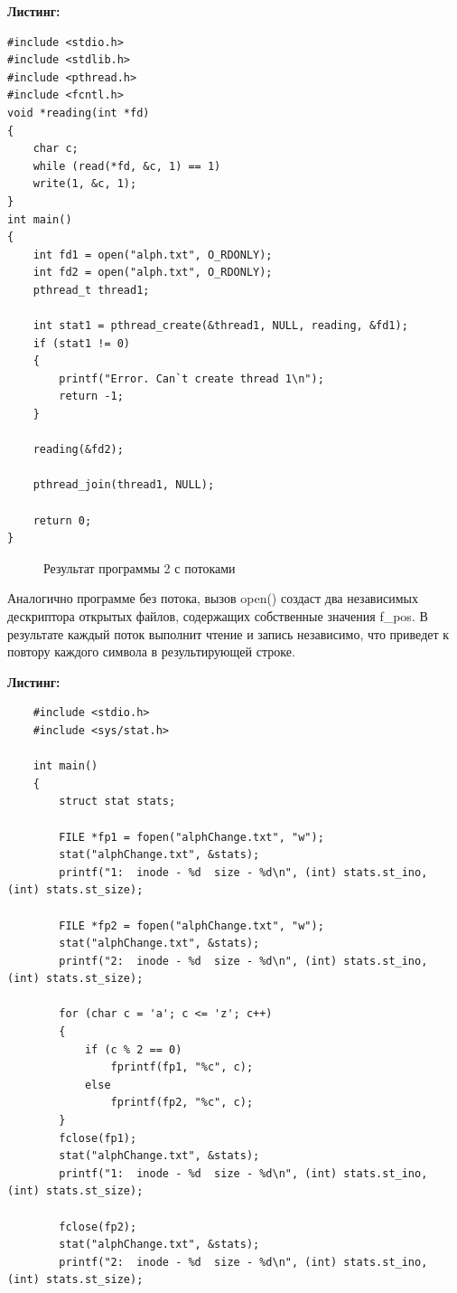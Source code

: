 \documentclass[14pt, a4paper]{extarticle}
\begin{document}
\clearpage
\textbf{Листинг:}
\begin{lstlisting}
#include <stdio.h>
#include <stdlib.h>
#include <pthread.h>
#include <fcntl.h>
void *reading(int *fd)
{
	char c;
	while (read(*fd, &c, 1) == 1)
	write(1, &c, 1);
}
int main()
{
	int fd1 = open("alph.txt", O_RDONLY);
	int fd2 = open("alph.txt", O_RDONLY);
	pthread_t thread1;
	
	int stat1 = pthread_create(&thread1, NULL, reading, &fd1);
	if (stat1 != 0)
	{
		printf("Error. Can`t create thread 1\n");
		return -1;
	}
	
	reading(&fd2);
	
	pthread_join(thread1, NULL);
	
	return 0;
}
\end{lstlisting}

\begin{figure}[h!]
	\caption{Результат программы 2 с потоками}
\end{figure}\par
Аналогично программе без потока, вызов open() создаст два независимых
дескриптора открытых файлов, содержащих собственные значения f\_pos. В
результате каждый поток выполнит чтение и запись независимо, что приведет к
повтору каждого символа в результирующей строке.

\newpage
\textbf{Листинг:}
\begin{lstlisting}
	#include <stdio.h>
	#include <sys/stat.h>
	
	int main()
	{
		struct stat stats;
		
		FILE *fp1 = fopen("alphChange.txt", "w");
		stat("alphChange.txt", &stats);
		printf("1:  inode - %d  size - %d\n", (int) stats.st_ino, (int) stats.st_size);
		
		FILE *fp2 = fopen("alphChange.txt", "w");
		stat("alphChange.txt", &stats);
		printf("2:  inode - %d  size - %d\n", (int) stats.st_ino, (int) stats.st_size);
		
		for (char c = 'a'; c <= 'z'; c++) 
		{
			if (c % 2 == 0)
				fprintf(fp1, "%c", c);		
			else
				fprintf(fp2, "%c", c);
		}	
		fclose(fp1);
		stat("alphChange.txt", &stats);
		printf("1:  inode - %d  size - %d\n", (int) stats.st_ino, (int) stats.st_size);
		
		fclose(fp2);
		stat("alphChange.txt", &stats);
		printf("2:  inode - %d  size - %d\n", (int) stats.st_ino, (int) stats.st_size);
		
\end{lstlisting}
\end{document}
